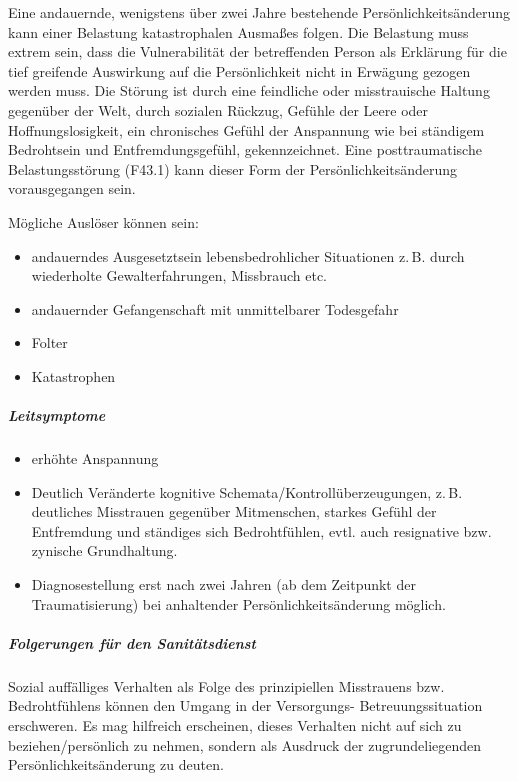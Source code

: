 {Eine andauernde, wenigstens über zwei Jahre bestehende
Persönlichkeitsänderung kann einer Belastung katastrophalen
Ausmaßes folgen. Die Belastung muss extrem sein, dass die
Vulnerabilität der betreffenden Person als Erklärung für die
tief greifende Auswirkung auf die Persönlichkeit nicht in
Erwägung gezogen werden muss. Die Störung ist durch eine
feindliche oder misstrauische Haltung gegenüber der Welt,
durch sozialen Rückzug, Gefühle der Leere oder
Hoffnungslosigkeit, ein chronisches Gefühl der Anspannung
wie bei ständigem Bedrohtsein und Entfremdungsgefühl,
gekennzeichnet. Eine posttraumatische Belastungsstörung
(F43.1) kann dieser Form der Persönlichkeitsänderung
vorausgegangen sein.

Mögliche Auslöser können sein:
\begin{itemize}
  \item andauerndes Ausgesetztsein lebensbedrohlicher
  Situationen z.\,B. durch wiederholte Gewalterfahrungen,
  Missbrauch etc.
  \item andauernder Gefangenschaft mit unmittelbarer Todesgefahr
  \item Folter
  \item Katastrophen
\end{itemize}
\subparagraph{Leitsymptome}
\begin{itemize}
  \item erhöhte Anspannung
  \item Deutlich Veränderte kognitive
  Schemata/Kontrollüberzeugungen, z.\,B. deutliches
  Misstrauen gegenüber Mitmenschen, starkes Gefühl  der
  Entfremdung und ständiges sich Bedrohtfühlen, evtl. auch
  resignative bzw. zynische Grundhaltung.
  \item Diagnosestellung erst nach zwei Jahren (ab dem
  Zeitpunkt der Traumatisierung) bei anhaltender
  Persönlichkeitsänderung möglich.
\end{itemize}

\subparagraph{Folgerungen für den Sanitätsdienst} Sozial auffälliges
Verhalten als Folge des prinzipiellen Misstrauens bzw.
Bedrohtfühlens können den Umgang in der Versorgungs-
Betreuungssituation erschweren. Es mag hilfreich erscheinen,
dieses Verhalten nicht auf sich zu beziehen/persönlich zu
nehmen, sondern als Ausdruck der zugrundeliegenden
Persönlichkeitsänderung zu deuten.}
{}
{}
{}
{}


